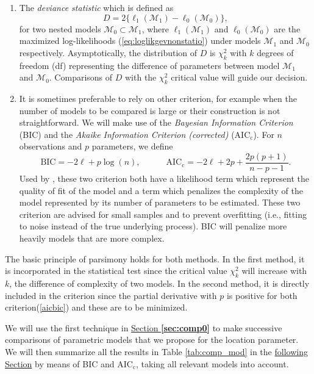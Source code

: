 \begin{enumerate}
	\item The \emph{deviance statistic} which is defined as 
	\begin{equation}
	D = 2\big\{\ell_1(\mathcal{M}_1)-\ell_0(\mathcal{M}_0)\big\},
	\end{equation}
	for two nested models $\mathcal{M}_0\subset \mathcal{M}_1$, where $\ell_1(\mathcal{M}_1)$ and $\ell_0(\mathcal{M}_0)$ are the maximized log-likelihoods (\ref{eq:loglikgevnonstatio}) under models $\mathcal{M}_1$ and $\mathcal{M}_0$ respectively.
	Asymptotically, the distribution of $D$ is $\chi^2_k$ with $k$ degrees of freedom (df) representing the difference of parameters between model $\mathcal{M}_1$ and $\mathcal{M}_0$. Comparisons of $D$ with the $\chi^2_k$ critical value will guide our decision.  
	
	\item\label{aicbic} It is sometimes preferable to rely on other criterion, for example when the number of models to be compared is large or their construction is not straightforward. We will make use of the \emph{Bayesian Information Criterion} (BIC) and  the \emph{Akaike Information Criterion (corrected) } ($\text{AIC}_{\text{c}}$). For $n$ observations and $p$ parameters, 
we define 
	\begin{equation}\label{aicbic}
\text{BIC} = -2\ell+ p\log(n), \qquad\quad \text{AIC}_{\text{c}}=-2\ell+2p+\frac{2p(p+1)}{n-p-1}.
	\end{equation}
	 Used by \citet{cannon_flexible_2010}, these two criterion both have a likelihood term which represent the quality of fit of the model and a term which penalizes the complexity of the model represented by its number of parameters to be estimated. These two criterion are advised for small samples and to prevent overfitting (i.e., fitting to noise instead of the true underlying process). BIC will penalize more heavily models that are more complex.
\end{enumerate}
The basic principle of parsimony holds for both methods. In the first method, it is incorporated in the statistical test since the critical value $\chi^2_k$ will increase with $k$, the difference of complexity of two models. In the second method, it is directly included in the criterion since the partial derivative with $p$ is positive for both criterion(\ref{aicbic}) and these are to be minimized. %

We will use the first technique in \hyperref[sec:comp0]{Section \textbf{\ref{sec:comp0}}} to make successive comparisons of parametric models that we propose for the location parameter. We will then summarize all the results in Table \ref{tab:comp_mod} in the \hyperref[sec:nnxp]{following Section} by means of BIC and $\text{AIC}_{\text{c}}$, taking all relevant models into account.


